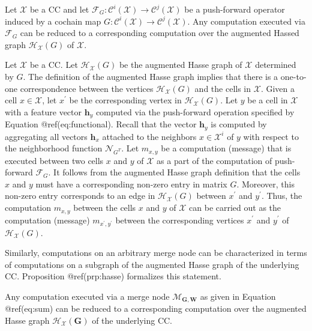 \documentclass[
  12pt,
]{krantz}
\begin{document}
\label{hasse-pushforward}
Let \(\mathcal{X}\) be a CC and let
\(\mathcal{F}_G \colon \mathcal{C}^i(\mathcal{X})\to \mathcal{C}^j(\mathcal{X})\)
be a push-forward operator induced by a cochain map
\(G\colon\mathcal{C}^i(\mathcal{X})\to \mathcal{C}^j(\mathcal{X})\). Any
computation executed via \(\mathcal{F}_G\) can be reduced to a
corresponding computation over the augmented Hassed graph
\(\mathcal{H}_{\mathcal{X}}(G)\) of \(\mathcal{X}\).

Let \(\mathcal{X}\) be a CC. Let \(\mathcal{H}_{\mathcal{X}}(G)\) be the
augmented Hasse graph of \(\mathcal{X}\) determined by \(G\). The
definition of the augmented Hasse graph implies that there is a
one-to-one correspondence between the vertices
\(\mathcal{H}_{\mathcal{X}}(G)\) and the cells in \(\mathcal{X}\). Given
a cell \(x\in \mathcal{X}\), let \(x^{\prime}\) be the corresponding
vertex in \(\mathcal{H}_{\mathcal{X}}(G)\). Let \(y\) be a cell in
\(\mathcal{X}\) with a feature vector \(\mathbf{h}_y\) computed via the
push-forward operation specified by Equation @ref(eq:functional). Recall
that the vector \(\mathbf{h}_y\) is computed by aggregating all vectors
\(\mathbf{h}_x\) attached to the neighbors \(x \in \mathcal{X}^i\) of
\(y\) with respect to the neighborhood function \(\mathcal{N}_{G^T}\).
Let \(m_{x,y}\) be a computation (message) that is executed between two
cells \(x\) and \(y\) of \(\mathcal{X}\) as a part of the computation of
push-forward \(\mathcal{F}_G\). It follows from the augmented Hasse
graph definition that the cells \(x\) and \(y\) must have a
corresponding non-zero entry in matrix \(G\). Moreover, this non-zero
entry corresponds to an edge in \(\mathcal{H}_{\mathcal{X}}(G)\) between
\(x^{\prime}\) and \(y^{\prime}\). Thus, the computation \(m_{x,y}\)
between the cells \(x\) and \(y\) of \(\mathcal{X}\) can be carried out
as the computation (message) \(m_{x^{\prime},y^{\prime}}\) between the
corresponding vertices \(x^{\prime}\) and \(y^{\prime}\) of
\(\mathcal{H}_{\mathcal{X}}(G)\).

Similarly, computations on an arbitrary merge node can be characterized
in terms of computations on a subgraph of the augmented Hasse graph of
the underlying CC. Proposition @ref(prp:hasse) formalizes this
statement.

\label{hasse}
Any computation executed via a merge node
\(\mathcal{M}_{\mathbf{G},\mathbf{W}}\) as given in Equation
@ref(eq:sum) can be reduced to a corresponding computation over the
augmented Hasse graph \(\mathcal{H}_{\mathcal{X}}(\mathbf{G})\) of the
underlying CC.
\end{document}
